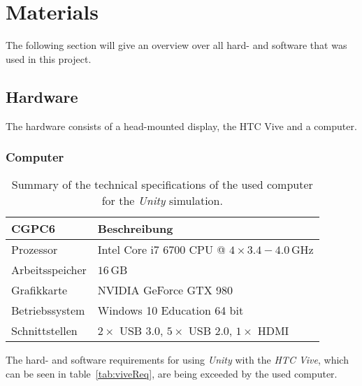 \section{Materials}\label{sec:Materials}

The following section will give an overview over all hard- and software that was used in this project. 

\subsection{Hardware}\label{sec:Hardware}

The hardware consists of a head-mounted display, the HTC Vive and a computer. 

\subsubsection{Computer}\label{sec:Computer}

\begin{table}
	\centering
	\begin{tabular}{|l|l|}
		\hline
		\Absatzbox{}
		\textbf{CGPC6}& \textbf{Beschreibung} \\
		\hline
		Prozessor & Intel Core i7 6700 CPU @ $4\times3.4-4.0\,$GHz \\
		\hline
		Arbeitsspeicher & $16\,$GB \\
		\hline 
		Grafikkarte & NVIDIA GeForce GTX 980\\
		\hline
		Betriebssystem & Windows 10 Education 64 bit \\
		\hline
		Schnittstellen & $2\times$ USB 3.0, $5\times$ USB 2.0, $1\times $ HDMI\\
		\hline
	\end{tabular}
	\caption{Summary of the technical specifications of the used computer for the \textit{Unity} simulation.}
	\label{tab:Computer}
\end{table}

The hard- and software requirements for using \textit{Unity} with the \textit{HTC Vive}, which can be seen in table~\ref{tab:viveReq}, are being exceeded by the used computer.   

